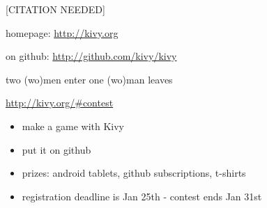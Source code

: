 \documentclass{beamer}
\begin{document}
\begin{frame}{[CITATION NEEDED]}

homepage:  \url{http://kivy.org}

on github: \url{http://github.com/kivy/kivy}

\end{frame}


\begin{frame}{two (wo)men enter one (wo)man leaves}

\url{http://kivy.org/\#contest}

\begin{itemize}
  \item make a game with Kivy
  \item put it on github
  \item prizes: android tablets, github subscriptions, t-shirts
  \item registration deadline is Jan 25th - contest ends Jan 31st
\end{itemize}
\end{frame}
\end{document}
